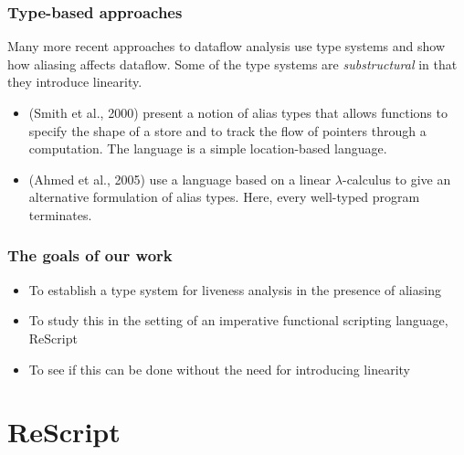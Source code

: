 \documentclass{beamer}
\begin{document}


  

\begin{frame}
  \frametitle{Type-based approaches}

  Many more recent approaches to dataflow analysis use type systems
  and show how aliasing affects dataflow. Some of the type systems are
  \emph{substructural} in that they introduce linearity.
  
  \begin{itemize}
  \item (Smith et al., 2000) present a notion of alias types that allows
    functions to specify the shape of a store and to track the flow of
    pointers through a computation. The language is a simple
    location-based language.
  \item (Ahmed et al., 2005) use a language based on a linear
    $\lambda$-calculus to give an alternative formulation of alias
    types. Here, every well-typed program terminates.
  \end{itemize}
\end{frame}

\begin{frame}
  \frametitle{The goals of our work}

  \begin{itemize}
  \item To establish a type system for liveness analysis in the
    presence of aliasing
  \item To study this in the setting of an imperative functional
    scripting language, ReScript
  \item To see if this can be done without the need for introducing linearity
  \end{itemize}
\end{frame}

\section{ReScript}
\end{document}
